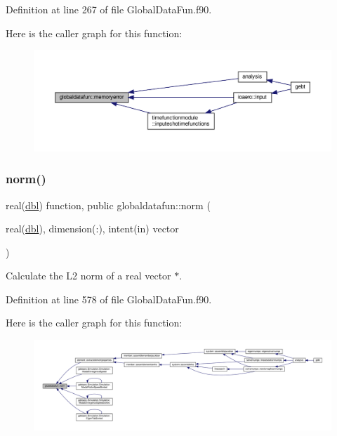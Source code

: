 Definition at line 267 of file Global\+Data\+Fun.\+f90.

Here is the caller graph for this function\+:\nopagebreak
\begin{figure}[H]
\begin{center}
\leavevmode
\includegraphics[width=350pt]{namespaceglobaldatafun_af28c2b9df0d5a1ef886c3d242fc15205_icgraph}
\end{center}
\end{figure}
\mbox{\label{namespaceglobaldatafun_a79010ea3a4434936e8a71182e62b6e48}} 
\subsubsection{\texorpdfstring{norm()}{norm()}}
{\footnotesize\ttfamily real(\hyperlink{namespaceglobaldatafun_a5008801201dd34f2af8eae07756befb4}{dbl}) function, public globaldatafun\+::norm (\begin{DoxyParamCaption}\item[{real(\hyperlink{namespaceglobaldatafun_a5008801201dd34f2af8eae07756befb4}{dbl}), dimension(\+:), intent(in)}]{vector }\end{DoxyParamCaption})}



Calculate the L2 norm of a real vector $\ast$. 



Definition at line 578 of file Global\+Data\+Fun.\+f90.

Here is the caller graph for this function\+:\nopagebreak
\begin{figure}[H]
\begin{center}
\leavevmode
\includegraphics[width=350pt]{namespaceglobaldatafun_a79010ea3a4434936e8a71182e62b6e48_icgraph}
\end{center}
\end{figure}
\mbox{\label{namespaceglobaldatafun_af49b8ee04a8cfd5d42b863a092e17e91}} 
